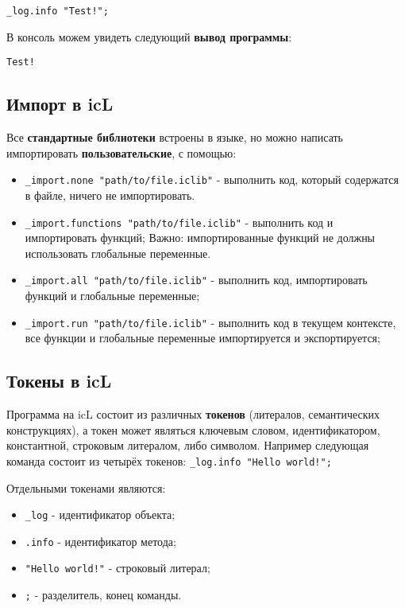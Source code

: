 \documentclass[a4paper, 14pt]{extarticle}
\newenvironment{icItems}
	{ \begin{itemize} [noitemsep,nolistsep] }
	{ \end{itemize} }
\begin{document}
\begin{lstlisting}[caption=Первая программа, label=first]
_log.info "Test!";
\end{lstlisting}

В консоль можем увидеть следующий \textbf{вывод программы}:

\begin{lstlisting}[numbers=none]
Test!
\end{lstlisting}

\subsection{Импорт в icL}

Все \textbf{стандартные библиотеки} встроены в языке, но можно написать импортировать \textbf{пользовательские}, с помощью:

\begin{icItems}
\item
	\lstinline|_import.none "path/to/file.iclib"| - выполнить код, который содержатся в файле, ничего не импортировать.
\item
	\lstinline|_import.functions "path/to/file.iclib"| - выполнить код и импортировать функций; {\color{red}Важно:} импортированные функций не должны использовать глобальные переменные.
\item
	\lstinline|_import.all "path/to/file.iclib"| -  выполнить код, импортировать функций и глобальные переменные;
\item
	\lstinline|_import.run "path/to/file.iclib"| - выполнить код в текущем контексте, все функции и глобальные переменные импортируется и экспортируется;
\end{icItems}

\subsection{Токены в icL}

Программа на icL состоит из различных \textbf{токенов} (литералов, семантических конструкциях), а токен может являться ключевым словом, идентификатором, константной, строковым литералом, либо символом. Например следующая команда состоит из четырёх токенов: \lstinline`_log.info "Hello world!";`

Отдельными токенами являются:

\begin{icItems}
\item
	\lstinline`_log` - идентификатор объекта;
\item
	\lstinline`.info` - идентификатор метода;
\item
	\lstinline`"Hello world!"` - строковый литерал;
\item
	\lstinline`;` - разделитель, конец команды.
\end{icItems}
\end{document}
